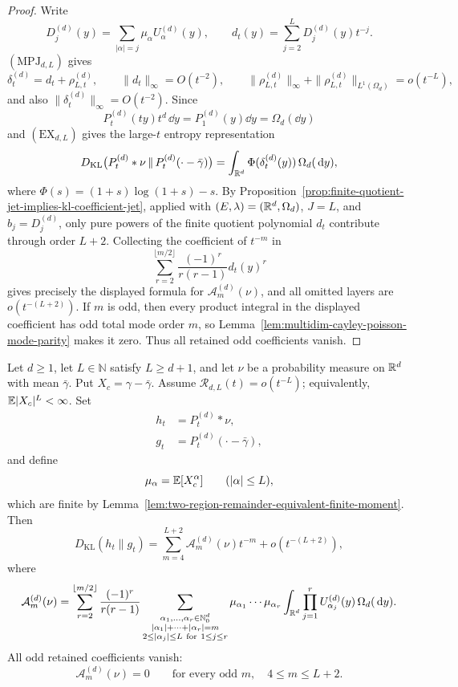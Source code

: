 \begin{proof}
Write
\[
D_j^{(d)}(y)=\sum_{|\alpha|=j}\mu_\alpha U_\alpha^{(d)}(y),\qquad
d_t(y)=\sum_{j=2}^{L}D_j^{(d)}(y)t^{-j}.
\]
\((\mathrm{MPJ}_{d,L})\) gives
\[
\delta_t^{(d)}=d_t+\rho_{L,t}^{(d)},\qquad
\|d_t\|_\infty=O(t^{-2}),\qquad
\|\rho_{L,t}^{(d)}\|_\infty+
\|\rho_{L,t}^{(d)}\|_{L^1(\Omega_d)}=o(t^{-L}),
\]
and also \(\|\delta_t^{(d)}\|_\infty=O(t^{-2})\).  Since
\[
P_t^{(d)}(ty)t^d\,\dd y=P_1^{(d)}(y)\dd y=\Omega_d(\dd y)
\]
and \((\mathrm{EX}_{d,L})\) gives the large-\(t\) entropy representation
\[
D_{\rm KL}\bigl(P_t^{(d)}*\nu\,\|\,P_t^{(d)}(\cdot-\bar{\gamma})\bigr)
=\int_{\mathbb{R}^d}\Phi(\delta_t^{(d)}(y))\,\Omega_d(\,\mathrm{d} y),
\]
where \(\Phi(s)=(1+s)\log(1+s)-s\).
By Proposition~\ref{prop:finite-quotient-jet-implies-kl-coefficient-jet},
applied with \((E,\lambda)=(\mathbb{R}^d,\Omega_d)\), \(J=L\), and
\(b_j=D_j^{(d)}\), only pure powers of the finite quotient polynomial
\(d_t\) contribute through order \(L+2\).  Collecting the coefficient of
\(t^{-m}\) in
\[
\sum_{r=2}^{\lfloor m/2\rfloor}
\frac{(-1)^r}{r(r-1)}d_t(y)^r
\]
gives precisely the displayed formula for \(\mathcal A_m^{(d)}(\nu)\), and
all omitted layers are \(o(t^{-(L+2)})\).  If \(m\) is odd, then every
product integral in the displayed coefficient has odd total mode order
\(m\), so Lemma~\ref{lem:multidim-cayley-poisson-mode-parity} makes it zero.
Thus all retained odd coefficients vanish.
\end{proof}

\begin{proposition}%
\label{thm:multidim-conditional-tail-poisson-kl-asymptotic}
Let \(d\ge1\), let \(L\in\mathbb N\) satisfy \(L\ge d+1\), and let \(\nu\) be
a probability measure on \(\mathbb{R}^d\) with mean \(\bar{\gamma}\).  Put
\(X_c=\gamma-\bar{\gamma}\).  Assume
\(\mathcal R_{d,L}(t)=o(t^{-L})\); equivalently,
\(\mathbb{E}|X_c|^L<\infty\).  Set
\[
\begin{aligned}
h_t&=P_t^{(d)}*\nu,\\
g_t&=P_t^{(d)}(\cdot-\bar{\gamma}),
\end{aligned}
\]
and define
\[
\mu_\alpha=\mathbb{E}[X_c^\alpha]\qquad(|\alpha|\le L),
\]
which are finite by
Lemma~\ref{lem:two-region-remainder-equivalent-finite-moment}.  Then
\[
D_{\mathrm{KL}}(h_t\|g_t)
=\sum_{m=4}^{L+2}\mathcal A_m^{(d)}(\nu)t^{-m}
+o(t^{-(L+2)}),
\]
where
\[
\mathcal A_m^{(d)}(\nu)=
\sum_{r=2}^{\lfloor m/2\rfloor}
\frac{(-1)^r}{r(r-1)}
\sum_{\substack{\alpha_1,\ldots,\alpha_r\in\mathbb{N}_0^d\\
|\alpha_1|+\cdots+|\alpha_r|=m\\
2\le|\alpha_j|\le L\ \mathrm{for}\ 1\le j\le r}}
\mu_{\alpha_1}\cdots\mu_{\alpha_r}
\int_{\mathbb{R}^d}\prod_{j=1}^r
U_{\alpha_j}^{(d)}(y)\,\Omega_d(\,\mathrm{d} y).
\]
All odd retained coefficients vanish:
\[
\mathcal A_m^{(d)}(\nu)=0
\qquad\text{for every odd }m,\quad 4\le m\le L+2.
\]
\end{proposition}

